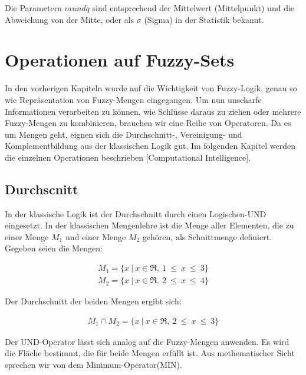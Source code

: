 Die Parametern $m und q$ sind entsprechend der Mittelwert (Mittelpunkt) und die Abweichung von der Mitte, oder als $\sigma$ (Sigma) in der Statistik bekannt.




%
%

\section{Operationen auf Fuzzy-Sets}
In den vorherigen Kapiteln wurde auf die Wichtigkeit von Fuzzy-Logik, genau so wie Repräsentation von Fuzzy-Mengen eingegangen. Um nun unscharfe Informationen verarbeiten zu können, wie Schlüsse daraus zu ziehen oder mehrere Fuzzy-Mengen zu kombinieren, brauchen wir eine Reihe von Operatoren. Da es um Mengen geht, eignen sich die Durchschnitt-, Vereinigung- und Komplementbildung aus der klassischen Logik gut. Im folgenden Kapitel werden die einzelnen Operationen beschrieben [Computational Intelligence].

\subsection{Durchscnitt}\label{AND}

In der klassische Logik ist der Durchschnitt durch einen Logischen-UND eingesetzt. In der klassischen Mengenlehre ist die Menge aller Elementen, die zu einer Menge $M_1$ und einer Menge $M_2$ gehören, als Schnittmenge definiert. Gegeben seien die Mengen:

\begin{align}
M_1 = \{ x \ | \ x \in\Re, \ 1 \ \leq \ x \ \leq \ 3 \} 
\end{align}
\begin{align}
 M_2 = \{ x \ | \ x \in\Re, \ 2 \ \leq \ x \ \leq \ 4 \} 
\end{align}

Der Durchschnitt der beiden Mengen ergibt sich:

\begin{align}
M_1 \cap M_2 = \{ x \ | \ x \in \Re, \ 2 \ \leq \ x \ \leq \ 3 \}
\end{align} 

Der UND-Operator lässt sich analog auf die Fuzzy-Mengen anwenden. Es wird die Fläche bestimmt, die für beide Mengen erfüllt ist. Aus methematischer Sicht sprechen wir von dem Minimum-Operator(MIN).

